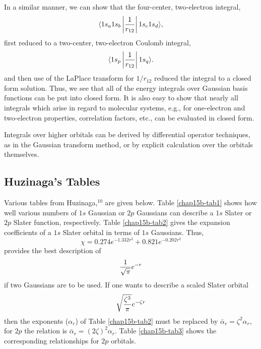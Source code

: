 In a similar manner, we can show that the four-center, two-electron
integral,
\begin{equation}
\langle 1s_a 1s_b \left| {1 \over r_{12}} \right| 1s_c 1s_d \rangle ,
\end{equation}
first reduced to a two-center, two-electron Coulomb integral,
\begin{equation}
\langle 1s_p \left| {1 \over r_{12}} \right| 1s_q \rangle .
\end{equation}
and then use of the LaPlace transform for $1/r_{12}$ reduced the integral to
a closed form solution.  Thus, we see that all of the energy integrals over
Gaussian basis functions can be put into closed form. It is also easy to 
show that nearly all integrals which arise in regard to molecular systems, 
e.g., for one-electron and two-electron properties, correlation factors, etc., 
can be evaluated in closed form.

Integrals over higher orbitals can be derived by differential operator
techniques, as in the Gaussian transform method, or by explicit calculation
over the orbitals themselves.

\subsection{Huzinaga's Tables}

Various tables from Huzinaga,$^{10}$ are given below. Table
\ref{chap15b-tab1} shows how well various numbers of $1s$ Gaussian or
$2p$ Gaussians can describe a $1s$ Slater or $2p$ Slater function,
respectively. Table \ref{chap15b-tab2} gives the expansion
coefficients of a $1s$ Slater orbital in terms of $1s$
Gaussians. Thus,
\begin{equation}
\chi = 0.274e^{-1.332r^2} + 0.821e^{-0.202r^2}
\end{equation}
provides the best description of
\begin{equation}
{1 \over \sqrt{\pi}} e^{-r}
\end{equation}
if two Gaussians are to be used.  If one wants to describe a scaled Slater
orbital
\begin{equation}
\sqrt{{\zeta^3 \over \pi}} e^{-\zeta r}
\end{equation}
then the exponents ($\alpha_r$) of Table \ref{chap15b-tab2} must be
replaced by ${\bar{\alpha}}_r = \zeta^2 \alpha_r$, for $2p$ the
relation is ${\bar{\alpha}}_r = (2 \zeta)^2\alpha_r$. Table
\ref{chap15b-tab3} shows the corresponding relationships for $2p$
orbitals.

